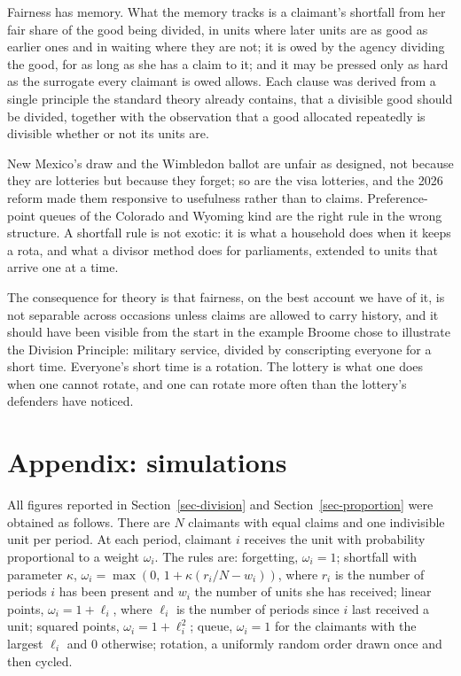 \documentclass[
  11pt,
  letterpaper,
  DIV=11,
  numbers=noendperiod,
  twoside]{scrartcl}
\begin{document}
Fairness has memory. What the memory tracks is a claimant's shortfall
from her fair share of the good being divided, in units where later
units are as good as earlier ones and in waiting where they are not; it
is owed by the agency dividing the good, for as long as she has a claim
to it; and it may be pressed only as hard as the surrogate every
claimant is owed allows. Each clause was derived from a single principle
the standard theory already contains, that a divisible good should be
divided, together with the observation that a good allocated repeatedly
is divisible whether or not its units are.

New Mexico's draw and the Wimbledon ballot are unfair as designed, not
because they are lotteries but because they forget; so are the visa
lotteries, and the 2026 reform made them responsive to usefulness rather
than to claims. Preference-point queues of the Colorado and Wyoming kind
are the right rule in the wrong structure. A shortfall rule is not
exotic: it is what a household does when it keeps a rota, and what a
divisor method does for parliaments, extended to units that arrive one
at a time.

The consequence for theory is that fairness, on the best account we have
of it, is not separable across occasions unless claims are allowed to
carry history, and it should have been visible from the start in the
example Broome chose to illustrate the Division Principle: military
service, divided by conscripting everyone for a short time. Everyone's
short time is a rotation. The lottery is what one does when one cannot
rotate, and one can rotate more often than the lottery's defenders have
noticed.

\section*{Appendix: simulations}\label{appendix-simulations}

All figures reported in Section~\ref{sec-division} and
Section~\ref{sec-proportion} were obtained as follows. There are \(N\)
claimants with equal claims and one indivisible unit per period. At each
period, claimant \(i\) receives the unit with probability proportional
to a weight \(\omega_i\). The rules are: forgetting, \(\omega_i = 1\);
shortfall with parameter \(\kappa\),
\(\omega_i = \max(0,\, 1 + \kappa(r_i/N - w_i))\), where \(r_i\) is the
number of periods \(i\) has been present and \(w_i\) the number of units
she has received; linear points, \(\omega_i = 1 + \ell_i\), where
\(\ell_i\) is the number of periods since \(i\) last received a unit;
squared points, \(\omega_i = 1 + \ell_i^2\); queue, \(\omega_i = 1\) for
the claimants with the largest \(\ell_i\) and \(0\) otherwise; rotation,
a uniformly random order drawn once and then cycled.
\end{document}
